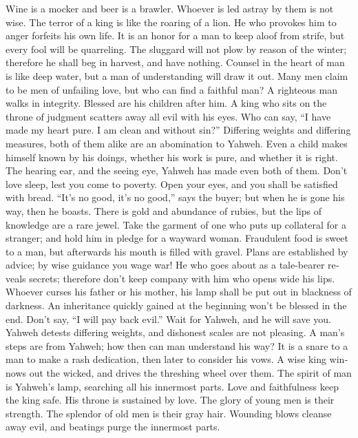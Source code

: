 \begin{paracol}{2}
\begin{otherlanguage}{english}
 Wine is a mocker and beer is a brawler. Whoever is led
astray by them is not wise.  The terror of a king is like
the roaring of a lion. He who provokes him to anger forfeits his own
life.  It is an honor for a man to keep aloof from strife,
but every fool will be quarreling.  The sluggard will not
plow by reason of the winter; therefore he shall beg in harvest, and
have nothing.  Counsel in the heart of man is like deep
water, but a man of understanding will draw it out.  Many
men claim to be men of unfailing love, but who can find a faithful man?
 A righteous man walks in integrity. Blessed are his
children after him.  A king who sits on the throne of
judgment scatters away all evil with his eyes.  Who can
say, ``I have made my heart pure. I am clean and without sin?''
 Differing weights and differing measures, both of them
alike are an abomination to Yahweh.  Even a child makes
himself known by his doings, whether his work is pure, and whether it is
right.  The hearing ear, and the seeing eye, Yahweh has
made even both of them.  Don't love sleep, lest you come
to poverty. Open your eyes, and you shall be satisfied with bread.
 ``It's no good, it's no good,'' says the buyer; but when
he is gone his way, then he boasts.  There is gold and
abundance of rubies, but the lips of knowledge are a rare jewel.
 Take the garment of one who puts up collateral for a
stranger; and hold him in pledge for a wayward woman. 
Fraudulent food is sweet to a man, but afterwards his mouth is filled
with gravel.  Plans are established by advice; by wise
guidance you wage war!  He who goes about as a
tale-bearer reveals secrets; therefore don't keep company with him who
opens wide his lips.  Whoever curses his father or his
mother, his lamp shall be put out in blackness of darkness.
 An inheritance quickly gained at the beginning won't be
blessed in the end.  Don't say, ``I will pay back evil.''
Wait for Yahweh, and he will save you.  Yahweh detests
differing weights, and dishonest scales are not pleasing.
 A man's steps are from Yahweh; how then can man
understand his way?  It is a snare to a man to make a
rash dedication, then later to consider his vows.  A wise
king winnows out the wicked, and drives the threshing wheel over them.
 The spirit of man is Yahweh's lamp, searching all his
innermost parts.  Love and faithfulness keep the king
safe. His throne is sustained by love.  The glory of
young men is their strength. The splendor of old men is their gray hair.
 Wounding blows cleanse away evil, and beatings purge the
innermost parts.


\end{otherlanguage}
\end{paracol}
